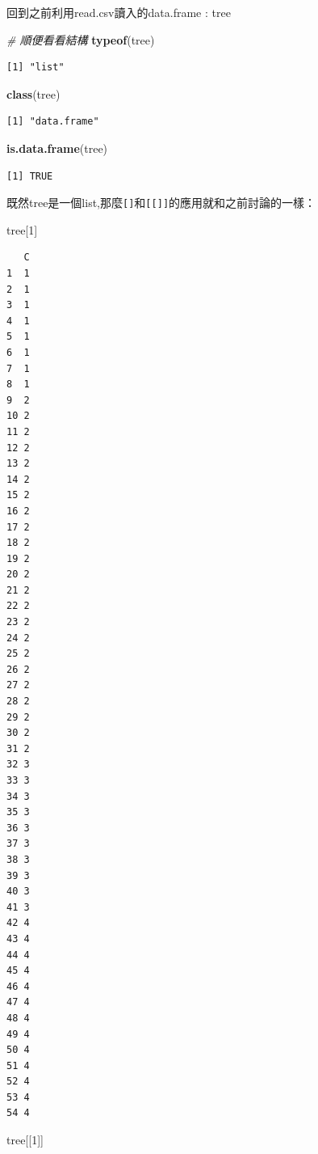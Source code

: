 \documentclass[]{book}
\newenvironment{Shaded}{\begin{snugshade}}{\end{snugshade}}
\newcommand{\CommentTok}[1]{\textcolor[rgb]{0.56,0.35,0.01}{\textit{#1}}}
\newcommand{\DecValTok}[1]{\textcolor[rgb]{0.00,0.00,0.81}{#1}}
\newcommand{\KeywordTok}[1]{\textcolor[rgb]{0.13,0.29,0.53}{\textbf{#1}}}
\newcommand{\NormalTok}[1]{#1}
\theoremstyle{definition}
\theoremstyle{definition}
\theoremstyle{definition}
\theoremstyle{remark}
\begin{document}
回到之前利用read.csv讀入的data.frame : tree

\begin{Shaded}
\begin{Highlighting}[]
\CommentTok{# 順便看看結構}
\KeywordTok{typeof}\NormalTok{(tree)}
\end{Highlighting}
\end{Shaded}

\begin{verbatim}
[1] "list"
\end{verbatim}

\begin{Shaded}
\begin{Highlighting}[]
\KeywordTok{class}\NormalTok{(tree)}
\end{Highlighting}
\end{Shaded}

\begin{verbatim}
[1] "data.frame"
\end{verbatim}

\begin{Shaded}
\begin{Highlighting}[]
\KeywordTok{is.data.frame}\NormalTok{(tree)}
\end{Highlighting}
\end{Shaded}

\begin{verbatim}
[1] TRUE
\end{verbatim}

既然tree是一個list,那麼\texttt{{[}{]}}和\texttt{{[}{[}{]}{]}}的應用就和之前討論的一樣：

\begin{Shaded}
\begin{Highlighting}[]
\NormalTok{tree[}\DecValTok{1}\NormalTok{]}
\end{Highlighting}
\end{Shaded}

\begin{verbatim}
   C
1  1
2  1
3  1
4  1
5  1
6  1
7  1
8  1
9  2
10 2
11 2
12 2
13 2
14 2
15 2
16 2
17 2
18 2
19 2
20 2
21 2
22 2
23 2
24 2
25 2
26 2
27 2
28 2
29 2
30 2
31 2
32 3
33 3
34 3
35 3
36 3
37 3
38 3
39 3
40 3
41 3
42 4
43 4
44 4
45 4
46 4
47 4
48 4
49 4
50 4
51 4
52 4
53 4
54 4
\end{verbatim}

\begin{Shaded}
\begin{Highlighting}[]
\NormalTok{tree[[}\DecValTok{1}\NormalTok{]] }
\end{Highlighting}
\end{Shaded}
\end{document}
